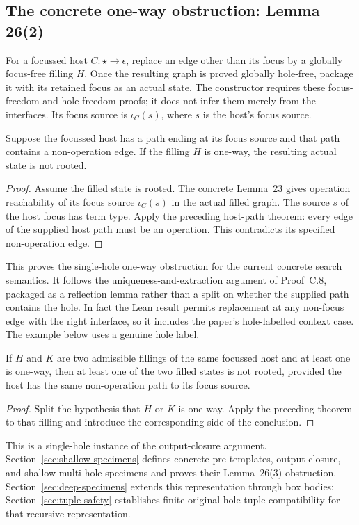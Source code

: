 \subsection{The concrete one-way obstruction: Lemma 26(2)}
\label{sec:one-way-obstruction}
For a focussed host $C:\star\to\epsilon$, replace an edge other than its
focus by a globally focus-free filling $H$. Once the resulting graph is
proved globally hole-free, package it with its retained focus as an actual
state. The constructor requires these focus-freedom and hole-freedom proofs;
it does not infer them merely from the interfaces. Its focus source is
$\iota_C(s)$, where $s$ is the host's focus source.

\begin{theorem}
Suppose the focussed host has a path ending at its focus source and that
path contains a non-operation edge. If the filling $H$ is one-way, the
resulting actual state is not rooted.
\end{theorem}
\begin{proof}
Assume the filled state is rooted. The concrete Lemma~23 gives operation
reachability of its focus source $\iota_C(s)$ in the actual filled graph.
The source $s$ of the host focus has term type. Apply the preceding host-path
theorem: every edge of the supplied host path must be an operation. This
contradicts its specified non-operation edge.
\end{proof}

This proves the single-hole one-way obstruction for the current concrete
search semantics. It follows the uniqueness-and-extraction argument of
Proof~C.8, packaged as a reflection lemma rather than a split on whether the
supplied path contains the hole. In fact the Lean result permits replacement
at any non-focus edge with the right interface, so it includes the paper's
hole-labelled context case. The example below uses a genuine hole label.

\begin{theorem}
If $H$ and $K$ are two admissible fillings of the same focussed host and at
least one is one-way, then at least one of the two filled states is not rooted,
provided the host has the same non-operation path to its focus source.
\end{theorem}
\begin{proof}
Split the hypothesis that $H$ or $K$ is one-way. Apply the preceding theorem
to that filling and introduce the corresponding side of the conclusion.
\end{proof}
This is a single-hole instance of the output-closure argument.
Section~\ref{sec:shallow-specimens} defines concrete pre-templates,
output-closure, and shallow multi-hole specimens and proves their
Lemma~26(3) obstruction. Section~\ref{sec:deep-specimens} extends this representation through
box bodies; Section~\ref{sec:tuple-safety} establishes finite original-hole
tuple compatibility for that recursive representation.

